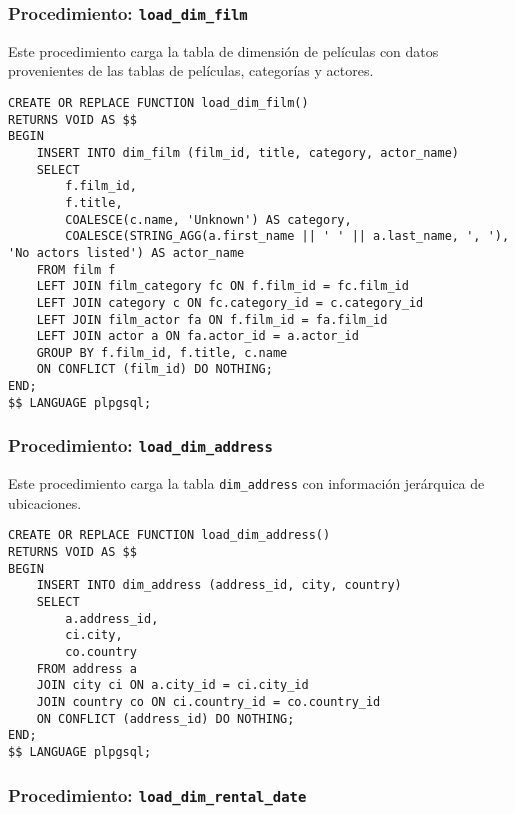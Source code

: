 \documentclass{article}
\begin{document}
\newpage
\subsubsection{Procedimiento: \texttt{load\_dim\_film}}

Este procedimiento carga la tabla de dimensión de películas con datos provenientes de las tablas de películas, categorías y actores.

\begin{lstlisting}
CREATE OR REPLACE FUNCTION load_dim_film()
RETURNS VOID AS $$
BEGIN
    INSERT INTO dim_film (film_id, title, category, actor_name)
    SELECT 
        f.film_id,                                
        f.title,                                  
        COALESCE(c.name, 'Unknown') AS category,  
        COALESCE(STRING_AGG(a.first_name || ' ' || a.last_name, ', '), 'No actors listed') AS actor_name
    FROM film f
    LEFT JOIN film_category fc ON f.film_id = fc.film_id
    LEFT JOIN category c ON fc.category_id = c.category_id
    LEFT JOIN film_actor fa ON f.film_id = fa.film_id
    LEFT JOIN actor a ON fa.actor_id = a.actor_id
    GROUP BY f.film_id, f.title, c.name
    ON CONFLICT (film_id) DO NOTHING;
END;
$$ LANGUAGE plpgsql;
\end{lstlisting}

\subsubsection{Procedimiento: \texttt{load\_dim\_address}}

Este procedimiento carga la tabla \texttt{dim\_address} con información jerárquica de ubicaciones.

\begin{lstlisting}
CREATE OR REPLACE FUNCTION load_dim_address()
RETURNS VOID AS $$
BEGIN
    INSERT INTO dim_address (address_id, city, country)
    SELECT 
        a.address_id,                
        ci.city,                     
        co.country                   
    FROM address a
    JOIN city ci ON a.city_id = ci.city_id
    JOIN country co ON ci.country_id = co.country_id
    ON CONFLICT (address_id) DO NOTHING;
END;
$$ LANGUAGE plpgsql;
\end{lstlisting}

\newpage
\subsubsection{Procedimiento: \texttt{load\_dim\_rental\_date}}
\end{document}
